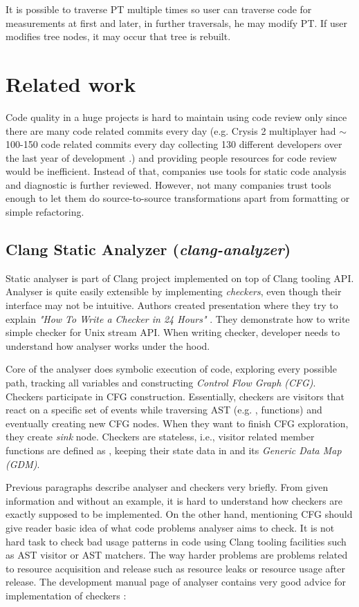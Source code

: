 It is possible to traverse PT multiple times so user can traverse code for measurements at first and later, in further traversals, he may modify PT. If user modifies tree nodes, it may occur that tree is rebuilt.

\section{Related work}
Code quality in a huge projects is hard to maintain using code review only since there are many code related commits every day (e.g. Crysis 2 multiplayer had $\sim$100-150 code related commits every day collecting 130 different developers over the last year of development \cite{crysis}.) and providing people resources for code review would be inefficient. Instead of that, companies use tools for static code analysis and diagnostic is further reviewed. However, not many companies trust tools enough to let them do source-to-source transformations apart from formatting or simple refactoring.

\subsection{Clang Static Analyzer (\emph{clang-analyzer})}
\label{clang-analyzer}
Static analyser is part of Clang project implemented on top of Clang tooling API. Analyser is quite easily extensible by implementing \emph{checkers}, even though their interface may not be intuitive. Authors created presentation where they try to explain \textit{"How To Write a Checker in 24 Hours"} \cite{clang-analyzer-presentation}. They demonstrate how to write simple checker for  Unix stream API. When writing checker, developer needs to understand how analyser works under the hood.

Core of the analyser does symbolic execution of code, exploring every possible path, tracking all variables and constructing \emph{Control Flow Graph (CFG)}. Checkers participate in CFG construction. Essentially, checkers are visitors that react on a specific set of events while traversing AST (e.g. ,  functions) and eventually creating new CFG nodes. When they want to finish CFG exploration, they create \emph{sink} node. Checkers are stateless, i.e., visitor related member functions are defined as , keeping their state data in  and its \emph{Generic Data Map (GDM)}.

Previous paragraphs describe analyser and checkers very briefly. From given information and without an example, it is hard to understand how checkers are exactly supposed to be implemented. On the other hand, mentioning CFG should give reader basic idea of what code problems analyser aims to check. It is not hard task to check bad usage patterns in code using Clang tooling facilities such as AST visitor or AST matchers. The way harder problems are problems related to resource acquisition and release such as resource leaks or resource usage after release. The development manual page of analyser contains very good advice for implementation of checkers \cite{clang-analyzer-manual}:\\

